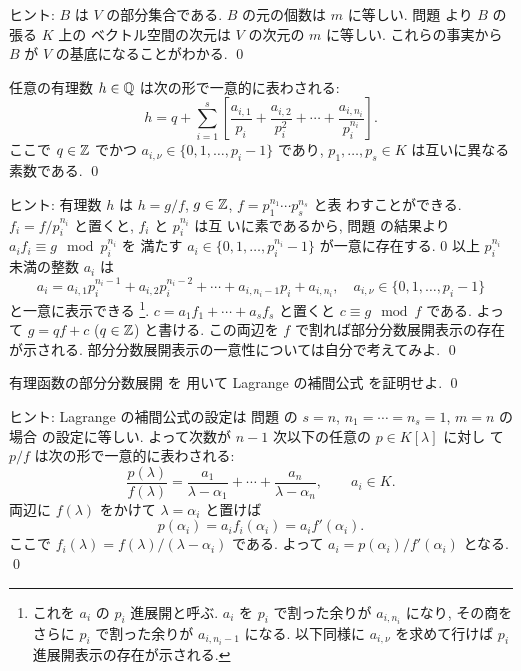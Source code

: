 \documentclass[12pt,twoside]{jarticle}
\begin{document}
\noindent
ヒント: $B$ は $V$ の部分集合である.
$B$ の元の個数は $m$ に等しい.
問題  より $B$ の張る $K$ 上の
ベクトル空間の次元は $V$ の次元の $m$ に等しい.
これらの事実から $B$ が $V$ の基底になることがわかる.
\qed


\begin{question}[有理数の部分分数展開]
\label{q:partial-fraction-2-Z}
  任意の有理数 $h\in{\mathbb Q}$ は次の形で一意的に表わされる:
  \begin{equation*}
    h
    = q
    + \sum_{i=1}^s
    \left[
      \frac{a_{i,1}}{p_i} +
      \frac{a_{i,2}}{p_i^2} + \cdots +
      \frac{a_{i,n_i}}{p_i^{n_i}}
    \right].
  \end{equation*}
  ここで $q\in{\mathbb Z}$ でかつ $a_{i,\nu}\in \{0,1,\dots,p_i-1\}$ であり, 
  $p_1,\dots,p_s\in K$ は互いに異なる素数である.
  \qed  
\end{question}

\noindent
ヒント: 有理数 $h$ は $h=g/f$, $g\in{\mathbb Z}$, $f=p_1^{n_1}\cdots p_s^{n_s}$ と表
わすことができる.  $f_i=f/p_i^{n_i}$ と置くと, $f_i$ と $p_i^{n_i}$ は互
いに素であるから, 
問題  の結果より $a_if_i\equiv g \mod{p_i^{n_i}}$ を
満たす $a_i\in\{0,1,\dots,p_i^{n_i}-1\}$ が一意に存在する.
$0$ 以上 $p_i^{n_i}$ 未満の整数 $a_i$ は
\begin{equation*}
  a_i 
  = a_{i,1}p_i^{n_i-1} + a_{i,2}p_i^{n_i-2} 
  + \cdots + a_{i,n_i-1}p_i + a_{i,n_i},
  \quad
  a_{i,\nu}\in\{0,1,\dots,p_i-1\}
\end{equation*}
と一意に表示できる%
\footnote{これを $a_i$ の $p_i$ 進展開と呼ぶ. 
  $a_i$ を $p_i$ で割った余りが $a_{i,n_i}$ になり,
  その商をさらに $p_i$ で割った余りが $a_{i,n_i-1}$ になる.
  以下同様に $a_{i,\nu}$ を求めて行けば $p_i$ 進展開表示の存在が示される.}. 
$c=a_1f_1+\cdots+a_sf_s$ と置くと $c\equiv g \mod{f}$ である.
よって $g=qf+c$ ($q\in{\mathbb Z}$) と書ける.  
この両辺を $f$ で割れば部分分数展開表示の存在が示される.
部分分数展開表示の一意性については自分で考えてみよ.
\qed


\begin{question}
  有理函数の部分分数展開  を
  用いて Lagrange の補間公式  を証明せよ. 
  \qed
\end{question}

\noindent
ヒント: Lagrange の補間公式の設定は
問題  の $s=n$, $n_1=\cdots=n_s=1$, $m=n$ の場合
の設定に等しい.  よって次数が $n-1$ 次以下の任意の $p\in K[\lambda]$ に対し
て $p/f$ は次の形で一意的に表わされる:
\begin{equation*}
  \frac{p(\lambda)}{f(\lambda)}
  = \frac{a_1}{\lambda-\alpha_1}+\cdots+\frac{a_n}{\lambda-\alpha_n},
  \qquad
  a_i\in K.
\end{equation*}
両辺に $f(\lambda)$ をかけて $\lambda=\alpha_i$ と置けば
\begin{equation*}
  p(\alpha_i) = a_i f_i(\alpha_i) = a_i f'(\alpha_i).
\end{equation*}
ここで $f_i(\lambda)=f(\lambda)/(\lambda-\alpha_i)$ である. 
よって $a_i=p(\alpha_i)/f'(\alpha_i)$ となる.
\qed
\end{document}
